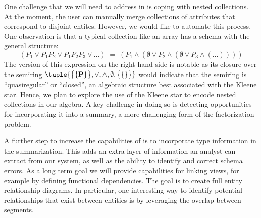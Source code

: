 One challenge that we will need to address in \systemnametwo is coping with nested collections.  
At the moment, the user can manually merge collections of attributes that correspond to disjoint entites.
However, we would like to automate this process.
One observation is that a typical collection like an array has a schema with the general structure:
$$(P_1 \vee P_1P_2 \vee P_1P_2P_3 \vee \ldots)\;=\;(P_1 \wedge (\emptyset \vee P_2 \wedge (\emptyset \vee P_3 \wedge (\ldots)) ))$$
The version of this expression on the right hand side is notable as its closure over the semiring $\tuple{\big\{\{\mathbf P\}\big\}, \vee, \wedge, \emptyset, \big\{\{\}\big\}}$ would indicate that the semiring is ``quasiregular'' or ``closed'', an algebraic structure best associated with the Kleene star.
Hence, we plan to explore the use of the Kleene star to encode nested collections in our algebra.
A key challenge in doing so is detecting opportunities for incorporating it into a summary, a more challenging form of the factorization problem.

A further step to increase the capabilities of \systemnametwo is to incorporate type information in the summarization. 
This adds an extra layer of information an analyst can extract from our system, as well as the ability to identify and correct schema errors. 
As a long term goal we will provide capabilities for linking views, for example by defining functional dependencies.
The goal is to create full entity relationship diagrams. 
In particular, one interesting way to identify potential relationships that exist between entities is by leveraging the overlap between segments.